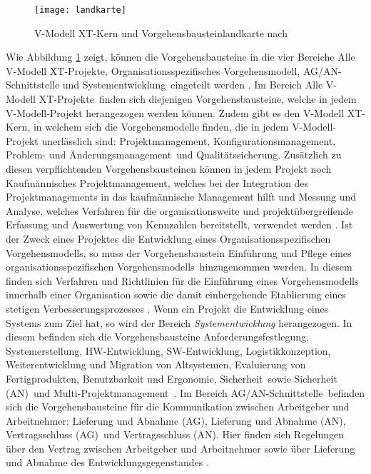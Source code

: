 \begin{figure}[htp]
\begin{center}
  \texttt{[image: landkarte]} %
  \caption{V-Modell XT-Kern und Vorgehensbausteinlandkarte nach \cite{2004vmodell}}
  \label{fig:landkarte}
\end{center}
\end{figure}

 Wie Abbildung \ref{fig:landkarte} zeigt, können die Vorgehensbausteine in die vier Bereiche \grqq Alle V-Modell XT-Projekte\grqq, \grqq Organisationsspezifisches Vorgehensmodell, \grqq AG/AN-Schnittstelle und \grqq Systementwicklung\grqq \  eingeteilt werden \cite{2004vmodell}.\newline
 Im Bereich \grqq Alle V-Modell XT-Projekte\grqq \ finden sich diejenigen Vorgehensbausteine, welche in jedem V-Modell-Projekt herangezogen werden können. Zudem gibt es den V-Modell XT-Kern, in welchem sich die Vorgehensmodelle finden, die in jedem V-Modell-Projekt unerlässlich sind: \grqq Projektmanagement\grqq, \grqq Konfigurationsmanagement\grqq, \grqq Problem- und Änderungsmanagement\grqq \ und \grqq Qualitätssicherung\grqq. Zusätzlich zu diesen verpflichtenden Vorgehensbausteinen können in jedem Projekt noch \grqq Kaufmännisches Projektmanagement\grqq, welches bei der Integration des Projektmanagements in das kaufmännische Management hilft und \grqq Messung und Analyse\grqq, welches Verfahren für die organisationsweite und projektübergreifende Erfassung und Auswertung von Kennzahlen bereitstellt, verwendet werden \cite{2004vmodell}.\newline
 Ist der Zweck eines Projektes die Entwicklung eines \grqq Organisationsspezifischen Vorgehensmodells\grqq, so muss der Vorgehensbaustein \grqq Einführung und Pflege eines organisationsspezifischen Vorgehensmodells\grqq \ hinzugenommen werden. In diesem finden sich Verfahren und Richtlinien für die Einführung eines Vorgehensmodells innerhalb einer Organisation sowie die damit einhergehende Etablierung eines stetigen Verbesserungsprozesses \cite{2004vmodell}.\newline
 Wenn ein Projekt die Entwicklung eines Systems zum Ziel hat, so wird der Bereich \textit{Systementwicklung} herangezogen. In diesem befinden sich die Vorgehensbausteine \grqq Anforderungsfestlegung\grqq, \grqq Systemerstellung\grqq, \grqq HW-Entwicklung\grqq, \grqq SW-Entwicklung\grqq, \grqq Logistikkonzeption\grqq, \grqq Weiterentwicklung und Migration von Altsystemen\grqq, \grqq Evaluierung von Fertigprodukten\grqq, \grqq Benutzbarkeit und Ergonomie\grqq, \grqq Sicherheit\grqq \ sowie \grqq Sicherheit (AN)\grqq \ und \grqq Multi-Projektmanagement\grqq \ \cite{2004vmodell}. \newline
 Im Bereich \grqq AG/AN-Schnittstelle\grqq \ befinden sich die Vorgehensbausteine für die Kommunikation zwischen Arbeitgeber und Arbeitnehmer: \grqq Lieferung und Abnahme (AG)\grqq, \grqq Lieferung und Abnahme (AN)\grqq, \grqq Vertragsschluss (AG)\grqq \ und \grqq Vertragsschluss (AN)\grqq. Hier finden sich Regelungen über den Vertrag zwischen Arbeitgeber und Arbeitnehmer sowie über Lieferung und Abnahme des Entwicklungsgegenstandes \cite{2004vmodell}. \newline
 
